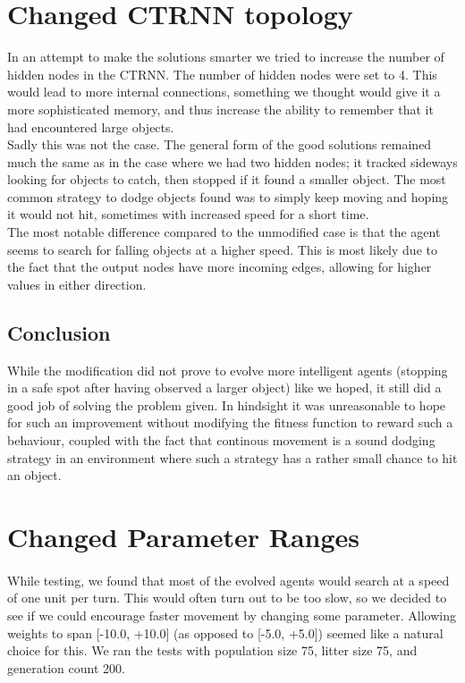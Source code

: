\documentclass[a4paper,12pt]{article}
\begin{document}
\section{Changed CTRNN topology}
In an attempt to make the solutions smarter we tried to increase the number of hidden nodes in the CTRNN. The number of hidden nodes were set to 4. This would lead to more internal connections, something we thought would give it a more sophisticated memory, and thus increase the ability to remember that it had encountered large objects. \\
Sadly this was not the case. The general form of the good solutions remained much the same as in the case where we had two hidden nodes; it tracked sideways looking for objects to catch, then stopped if it found a smaller object. The most common strategy to dodge objects found was to simply keep moving and hoping it would not hit, sometimes with increased speed for a short time. \\
The most notable difference compared to the unmodified case is that the agent seems to search for falling objects at a higher speed. This is most likely due to the fact that the output nodes have more incoming edges, allowing for higher values in either direction.
\subsection{Conclusion}
While the modification did not prove to evolve more intelligent agents (stopping in a safe spot after having observed a larger object) like we hoped, it still did a good job of solving the problem given. In hindsight it was unreasonable to hope for such an improvement without modifying the fitness function to reward such a behaviour, coupled with the fact that continous movement is a sound dodging strategy in an environment where such a strategy has a rather small chance to hit an object.

\section{Changed Parameter Ranges}
\paragraph{}While testing, we found that most of the evolved agents would search at a speed of one unit per turn. This would often turn out to be too slow, so we decided to see if we could encourage faster movement by changing some parameter. Allowing weights to span [-10.0, +10.0] (as opposed to [-5.0, +5.0]) seemed like a natural choice for this. We ran the tests with population size 75, litter size 75, and generation count 200.
\end{document}
